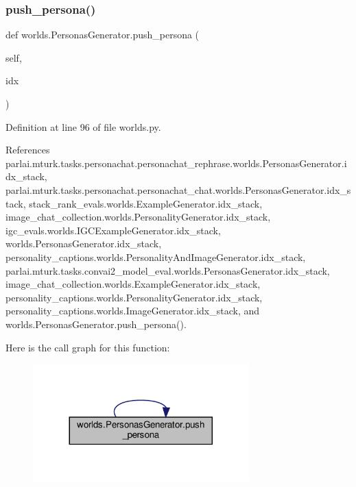 \subsubsection{\texorpdfstring{push\+\_\+persona()}{push\_persona()}\hspace{0.1cm}{\footnotesize\ttfamily [1/2]}}
{\footnotesize\ttfamily def worlds.\+Personas\+Generator.\+push\+\_\+persona (\begin{DoxyParamCaption}\item[{}]{self,  }\item[{}]{idx }\end{DoxyParamCaption})}



Definition at line 96 of file worlds.\+py.



References parlai.\+mturk.\+tasks.\+personachat.\+personachat\+\_\+rephrase.\+worlds.\+Personas\+Generator.\+idx\+\_\+stack, parlai.\+mturk.\+tasks.\+personachat.\+personachat\+\_\+chat.\+worlds.\+Personas\+Generator.\+idx\+\_\+stack, stack\+\_\+rank\+\_\+evals.\+worlds.\+Example\+Generator.\+idx\+\_\+stack, image\+\_\+chat\+\_\+collection.\+worlds.\+Personality\+Generator.\+idx\+\_\+stack, igc\+\_\+evals.\+worlds.\+I\+G\+C\+Example\+Generator.\+idx\+\_\+stack, worlds.\+Personas\+Generator.\+idx\+\_\+stack, personality\+\_\+captions.\+worlds.\+Personality\+And\+Image\+Generator.\+idx\+\_\+stack, parlai.\+mturk.\+tasks.\+convai2\+\_\+model\+\_\+eval.\+worlds.\+Personas\+Generator.\+idx\+\_\+stack, image\+\_\+chat\+\_\+collection.\+worlds.\+Example\+Generator.\+idx\+\_\+stack, personality\+\_\+captions.\+worlds.\+Personality\+Generator.\+idx\+\_\+stack, personality\+\_\+captions.\+worlds.\+Image\+Generator.\+idx\+\_\+stack, and worlds.\+Personas\+Generator.\+push\+\_\+persona().

Here is the call graph for this function\+:
\nopagebreak
\begin{figure}[H]
\begin{center}
\leavevmode
\includegraphics[width=236pt]{classworlds_1_1PersonasGenerator_acc8e5aeffdb815f8ca89af167cf8062e_cgraph}
\end{center}
\end{figure}
\mbox{\label{classworlds_1_1PersonasGenerator_acc8e5aeffdb815f8ca89af167cf8062e}} 
